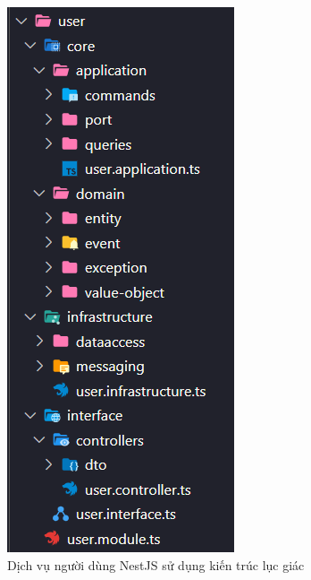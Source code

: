 \begin{figure}[H]

    \centering
    
    \includegraphics[scale = 0.9]{pictures/_dich_vu_nguoi_dung_nestjs_su_dung_kien_truc_luc_giac/main.png}
    
    \caption{Dịch vụ người dùng NestJS sử dụng kiến trúc lục giác}
    
    \end{figure}











